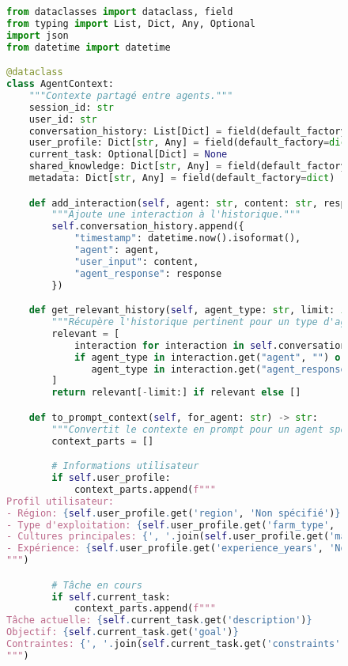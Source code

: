 \begin{figure}[h]
\centering
\begin{lstlisting}[language=Python, caption=Système de gestion du contexte inter-agents]
from dataclasses import dataclass, field
from typing import List, Dict, Any, Optional
import json
from datetime import datetime

@dataclass
class AgentContext:
    """Contexte partagé entre agents."""
    session_id: str
    user_id: str
    conversation_history: List[Dict] = field(default_factory=list)
    user_profile: Dict[str, Any] = field(default_factory=dict)
    current_task: Optional[Dict] = None
    shared_knowledge: Dict[str, Any] = field(default_factory=dict)
    metadata: Dict[str, Any] = field(default_factory=dict)

    def add_interaction(self, agent: str, content: str, response: str):
        """Ajoute une interaction à l'historique."""
        self.conversation_history.append({
            "timestamp": datetime.now().isoformat(),
            "agent": agent,
            "user_input": content,
            "agent_response": response
        })

    def get_relevant_history(self, agent_type: str, limit: int = 5) -> List[Dict]:
        """Récupère l'historique pertinent pour un type d'agent."""
        relevant = [
            interaction for interaction in self.conversation_history
            if agent_type in interaction.get("agent", "") or
               agent_type in interaction.get("agent_response", "")
        ]
        return relevant[-limit:] if relevant else []

    def to_prompt_context(self, for_agent: str) -> str:
        """Convertit le contexte en prompt pour un agent spécifique."""
        context_parts = []

        # Informations utilisateur
        if self.user_profile:
            context_parts.append(f"""
Profil utilisateur:
- Région: {self.user_profile.get('region', 'Non spécifié')}
- Type d'exploitation: {self.user_profile.get('farm_type', 'Non spécifié')}
- Cultures principales: {', '.join(self.user_profile.get('main_crops', []))}
- Expérience: {self.user_profile.get('experience_years', 'Non spécifié')} ans
""")

        # Tâche en cours
        if self.current_task:
            context_parts.append(f"""
Tâche actuelle: {self.current_task.get('description')}
Objectif: {self.current_task.get('goal')}
Contraintes: {', '.join(self.current_task.get('constraints', []))}
""")


\end{lstlisting}
\end{figure}
